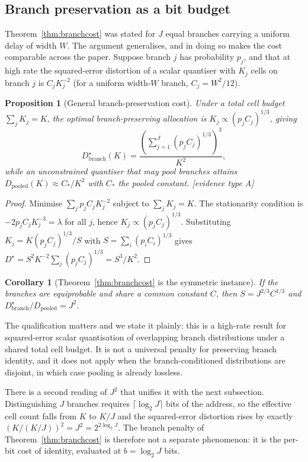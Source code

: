 \documentclass[11pt]{article}
\newtheorem{proposition}[theorem]{Proposition}
\newtheorem{corollary}[theorem]{Corollary}
\begin{document}
\subsection{Branch preservation as a bit budget}

Theorem~\ref{thm:branchcost} was stated for $J$ equal branches carrying a uniform delay of
width $W$. The argument generalises, and in doing so makes the cost comparable across the
paper. Suppose branch $j$ has probability $p_j$, and that at high rate the squared-error
distortion of a scalar quantiser with $K_j$ cells on branch $j$ is $C_jK_j^{-2}$ (for a
uniform width-$W$ branch, $C_j=W^2/12$).

\begin{proposition}[General branch-preservation cost]\label{prop:generalbranch}
Under a total cell budget $\sum_j K_j=K$, the optimal branch-preserving allocation is
$K_j\propto(p_jC_j)^{1/3}$, giving
\begin{equation}
D_{\mathrm{branch}}^\star(K)=\frac{\left(\sum_{j=1}^{J}(p_jC_j)^{1/3}\right)^{\!3}}{K^{2}},
\end{equation}
while an unconstrained quantiser that may pool branches attains $D_{\mathrm{pooled}}(K)
\approx C_\ast/K^2$ with $C_\ast$ the pooled constant. [evidence type A]
\end{proposition}
\begin{proof}
Minimise $\sum_j p_jC_jK_j^{-2}$ subject to $\sum_jK_j=K$. The stationarity condition is
$-2p_jC_jK_j^{-3}=\lambda$ for all $j$, hence $K_j\propto(p_jC_j)^{1/3}$. Substituting
$K_j=K(p_jC_j)^{1/3}/S$ with $S=\sum_i(p_iC_i)^{1/3}$ gives
$D^\star=S^2K^{-2}\sum_j(p_jC_j)^{1/3}=S^3/K^2$.
\end{proof}

\begin{corollary}[Theorem~\ref{thm:branchcost} is the symmetric instance]\label{cor:j2}
If the branches are equiprobable and share a common constant $C$, then
$S=J^{2/3}C^{1/3}$ and $D^\star_{\mathrm{branch}}/D_{\mathrm{pooled}}=J^{2}$.
\end{corollary}

The qualification matters and we state it plainly: this is a high-rate result for
squared-error scalar quantisation of overlapping branch distributions under a shared total
cell budget. It is not a universal penalty for preserving branch identity, and it does not
apply when the branch-conditioned distributions are disjoint, in which case pooling is
already lossless.

There is a second reading of $J^2$ that unifies it with the next subsection. Distinguishing
$J$ branches requires $\lceil\log_2J\rceil$ bits of the address, so the effective cell count
falls from $K$ to $K/J$ and the squared-error distortion rises by exactly
$(K/(K/J))^2=J^2=2^{2\log_2 J}$. The branch penalty of Theorem~\ref{thm:branchcost} is
therefore not a separate phenomenon: it is the per-bit cost of identity, evaluated at
$b=\log_2 J$ bits.
\end{document}

